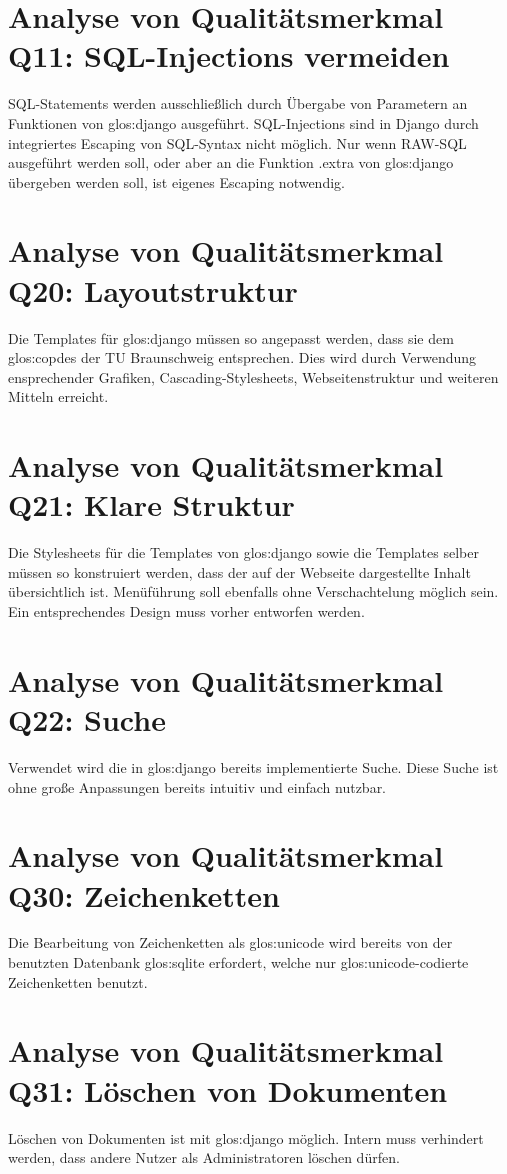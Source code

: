 \section{Analyse von Qualitätsmerkmal Q11: SQL-Injections vermeiden}

SQL-Statements werden ausschließlich durch Übergabe von Parametern an 
Funktionen von \gls{glos:django} ausgeführt. SQL-Injections sind in Django durch 
integriertes Escaping von SQL-Syntax nicht möglich. Nur wenn RAW-SQL 
ausgeführt werden soll, oder aber an die Funktion .extra von \gls{glos:django} 
übergeben werden soll, ist eigenes Escaping notwendig.

\section{Analyse von Qualitätsmerkmal Q20: Layoutstruktur}

Die Templates für \gls{glos:django} müssen so angepasst werden, dass sie dem
\Gls{glos:copdes}  der TU Braunschweig entsprechen. Dies wird durch Verwendung
ensprechender Grafiken, Cascading-Stylesheets, Webseitenstruktur und weiteren
Mitteln erreicht.


\section{Analyse von Qualitätsmerkmal Q21: Klare Struktur}

Die Stylesheets für die Templates von \gls{glos:django} sowie die Templates selber
müssen so konstruiert werden, dass der auf der Webseite dargestellte 
Inhalt übersichtlich ist. Menüführung soll ebenfalls ohne Verschachtelung
möglich sein. Ein entsprechendes Design muss vorher entworfen werden.


\section{Analyse von Qualitätsmerkmal Q22: Suche}

Verwendet wird die in \gls{glos:django} bereits implementierte Suche. Diese Suche ist ohne
große Anpassungen bereits intuitiv und einfach nutzbar.


\section{Analyse von Qualitätsmerkmal Q30: Zeichenketten} 

Die Bearbeitung von Zeichenketten als \Gls{glos:unicode} wird bereits von der benutzten
Datenbank \Gls{glos:sqlite} erfordert, welche nur \Gls{glos:unicode}-codierte Zeichenketten benutzt.


\section{Analyse von Qualitätsmerkmal Q31: Löschen von Dokumenten} 

Löschen von Dokumenten ist mit \gls{glos:django} möglich. Intern muss verhindert werden,
dass andere Nutzer als Administratoren löschen dürfen.
